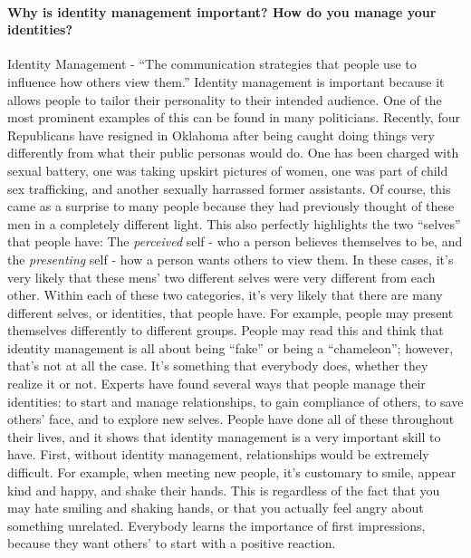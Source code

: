 \documentclass[12pt]{article}
\begin{document}
\paragraph{Why is identity management important? How do you manage your identities?}
Identity Management - ``The communication strategies that people use to influence how others view them.''
\newline
\indent Identity management is important because it allows people to tailor their personality to their intended audience.  One of the most prominent examples of this can be found in many politicians.  Recently, four Republicans have resigned in Oklahoma after being caught doing things very differently from what their public personas would do.  One has been charged with sexual battery, one was taking upskirt pictures of women, one was part of child sex trafficking, and another sexually harrassed former assistants.  Of course, this came as a surprise to many people because they had previously thought of these men in a completely different light.  
\newline
\indent This also perfectly highlights the two ``selves'' that people have:  The \emph{perceived} self - who a person believes themselves to be, and the \emph{presenting} self - how a person wants others to view them.  In these cases, it's very likely that these mens' two different selves were very different from each other.  Within each of these two categories, it's very likely that there are many different selves, or identities, that people have.  For example, people may present themselves differently to different groups.
\newline
\indent People may read this and think that identity management is all about being ``fake'' or being a ``chameleon''; however, that's not at all the case.  It's something that everybody does, whether they realize it or not.  Experts have found several ways that people manage their identities: to start and manage relationships, to gain compliance of others, to save others' face, and to explore new selves.  People have done all of these throughout their lives, and it shows that identity management is a very important skill to have.
\newline
\indent First, without identity management, relationships would be extremely difficult.  For example, when meeting new people, it's customary to smile, appear kind and happy, and shake their hands.  This is regardless of the fact that you may hate smiling and shaking hands, or that you actually feel angry about something unrelated.  Everybody learns the importance of first impressions, because they want others' to start with a positive reaction.
\end{document}
